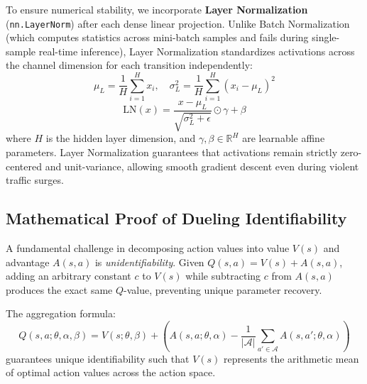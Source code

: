 To ensure numerical stability, we incorporate \textbf{Layer Normalization} (\texttt{nn.LayerNorm}) \cite{ba2016layer} after each dense linear projection. Unlike Batch Normalization (which computes statistics across mini-batch samples and fails during single-sample real-time inference), Layer Normalization standardizes activations across the channel dimension for each transition independently:
\begin{equation}
    \mu_L = \frac{1}{H} \sum_{i=1}^H x_i, \quad \sigma_L^2 = \frac{1}{H} \sum_{i=1}^H (x_i - \mu_L)^2
\end{equation}
\begin{equation}
    \text{LN}(x) = \frac{x - \mu_L}{\sqrt{\sigma_L^2 + \epsilon}} \odot \gamma + \beta
\end{equation}
where $H$ is the hidden layer dimension, and $\gamma, \beta \in \mathbb{R}^H$ are learnable affine parameters. Layer Normalization guarantees that activations remain strictly zero-centered and unit-variance, allowing smooth gradient descent even during violent traffic surges.

\subsection{Mathematical Proof of Dueling Identifiability}
A fundamental challenge in decomposing action values into value $V(s)$ and advantage $A(s, a)$ is \emph{unidentifiability}. Given $Q(s, a) = V(s) + A(s, a)$, adding an arbitrary constant $c$ to $V(s)$ while subtracting $c$ from $A(s, a)$ produces the exact same $Q$-value, preventing unique parameter recovery.

\begin{theorem}
The aggregation formula:
\begin{equation}
    Q(s, a; \theta, \alpha, \beta) = V(s; \theta, \beta) + \left( A(s, a; \theta, \alpha) - \frac{1}{|\mathcal{A}|} \sum_{a' \in \mathcal{A}} A(s, a'; \theta, \alpha) \right)
    \label{eq:dueling_identifiability_proof}
\end{equation}
guarantees unique identifiability such that $V(s)$ represents the arithmetic mean of optimal action values across the action space.
\end{theorem}

